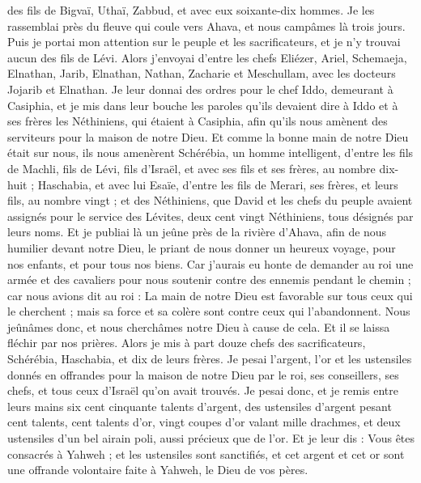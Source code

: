 \begin{multicols}{2}
des fils de Bigvaï, Uthaï, Zabbud, et avec eux soixante-dix hommes.
Je les rassemblai près du fleuve qui coule vers Ahava, et nous campâmes là trois jours. Puis je portai mon attention sur  le peuple et les sacrificateurs, et je n'y trouvai aucun des fils de Lévi.
Alors j'envoyai d'entre les chefs Eliézer, Ariel, Schemaeja, Elnathan, Jarib, Elnathan, Nathan, Zacharie et Meschullam, avec les docteurs Jojarib et Elnathan.
Je leur donnai des ordres pour le chef Iddo, demeurant à Casiphia, et je mis dans leur bouche les paroles qu'ils devaient dire à Iddo et à ses frères les Néthiniens, qui étaient à Casiphia, afin qu'ils nous amènent des serviteurs pour la maison de notre Dieu.
Et comme la bonne main de notre Dieu était sur nous, ils nous amenèrent Schérébia, un homme intelligent, d'entre les fils de Machli, fils de Lévi, fils d'Israël, et avec ses fils et ses frères, au nombre dix-huit ;
Haschabia, et avec lui Esaïe, d'entre les fils de Merari, ses frères, et leurs fils, au nombre vingt ;
et des Néthiniens, que David et les chefs du peuple avaient assignés pour le service des Lévites, deux cent vingt Néthiniens, tous désignés par leurs noms.
Et je publiai là un jeûne près de la rivière d'Ahava, afin de nous humilier devant notre Dieu, le priant de nous donner un heureux voyage, pour nos enfants, et pour tous nos biens.
Car j'aurais eu honte de demander au roi une armée et des cavaliers pour nous soutenir contre des ennemis pendant le chemin ; car nous avions dit au roi : La main de notre Dieu est favorable sur tous ceux qui le cherchent ; mais sa force et sa colère sont contre ceux qui l'abandonnent.
Nous jeûnâmes donc, et nous cherchâmes notre Dieu à cause de cela. Et il se laissa fléchir par nos prières.
Alors je mis à part douze chefs des sacrificateurs, Schérébia, Haschabia, et dix de leurs frères.
Je pesai l'argent, l'or et les ustensiles donnés en offrandes pour la maison de notre Dieu par le roi, ses conseillers, ses chefs, et tous ceux d'Israël qu'on avait trouvés.
Je pesai donc, et je remis entre leurs mains six cent cinquante talents d'argent, des ustensiles d'argent pesant cent talents, cent talents d'or,
vingt coupes d'or valant mille drachmes, et deux ustensiles d’un bel airain poli, aussi précieux que de l'or.
Et je leur dis : Vous êtes consacrés à Yahweh ; et les ustensiles sont sanctifiés, et cet argent et cet or sont une offrande volontaire faite à Yahweh, le Dieu de vos pères.

\end{multicols}
